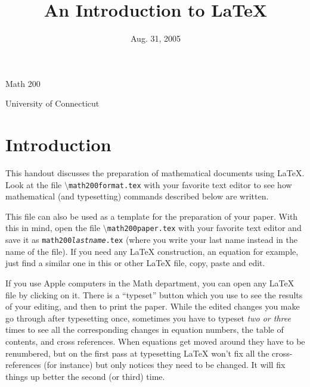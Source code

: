 \documentclass[12pt,letterpaper]{amsart}
\newcommand{\latex}{\LaTeX}
\newcommand{\sm}{\setminus}
\newcommand{\pln}[1]{$\sm${\tt #1}}
\theoremstyle{plain}
\theoremstyle{definition}
\numberwithin{equation}{section}
\begin{document}
\begin{titlepage}
\title{An Introduction to \latex}
\author{}
\date{Aug. 31, 2005}
\maketitle

\centerline{\Large Math 200}

\hfill

\centerline{\Large University of Connecticut}
\thispagestyle{empty}
\end{titlepage}
\pagebreak



\thispagestyle{empty}
\tableofcontents


\vfill



\pagebreak
 


\section{Introduction}\label{intro}

This handout discusses the preparation of 
mathematical documents using \latex.  
Look at the file \pln{math200format.tex} with your 
favorite text editor to see how mathematical (and typesetting) commands 
described below are written. 

This file can also be used as a template for the preparation of your paper. 
With this in mind, open the file \pln{math200paper.tex} with your 
favorite text editor  and save it as 
{\tt math200{\it lastname}.tex} (where you write your last name instead in 
the name of the file). 
If you need any \latex{} construction, an equation for example, 
just find a similar one in this or other \latex{} file, copy, paste and edit. 

If you use Apple computers in the Math department, you can open any 
\latex{} file by clicking on it. There is a ``typeset'' button which you use 
to see the results of your editing, and then to print the paper.
While the edited changes you make go through after typesetting once, 
sometimes you have to typeset {\it two or three} times to see 
all the corresponding changes in equation numbers, the table of contents, and
cross references.  When equations get moved around they have to be renumbered, 
but on the first 
pass at typesetting \latex{} won't fix all the cross-references (for instance) but only notices 
they need to be changed.  It will fix things up better the second (or third) 
time.
\end{document}
